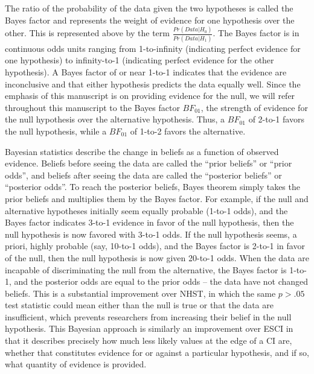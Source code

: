 \documentclass[fignum,nobf,man]{apa}
\begin{document}
The ratio of the probability of the data given the two hypotheses is called the Bayes factor and represents the weight of evidence for one hypothesis over the other. This is represented above by the term %
$\frac{Pr(Data | H_0)}{Pr(Data | H_1)}$. The Bayes factor is in continuous odds units ranging from 1-to-infinity (indicating perfect evidence for one hypothesis) to infinity-to-1 (indicating perfect evidence for the other hypothesis). A Bayes factor of or near 1-to-1 indicates that the evidence are inconclusive and that either hypothesis predicts the data equally well. Since the emphasis of this manuscript is on providing evidence for the null, we will refer throughout this manuscript to the Bayes factor $BF_{01}$, the strength of evidence for the null hypothesis over the alternative hypothesis. Thus, a $BF_{01}$ of 2-to-1 favors the null hypothesis, while a $BF_{01}$ of 1-to-2 favors the alternative.

Bayesian statistics describe the change in beliefs as a function of observed evidence. Beliefs before seeing the data are called the ``prior beliefs'' or ``prior odds'', and beliefs after seeing the data are called the ``posterior beliefs'' or ``posterior odds''. To reach the posterior beliefs, Bayes theorem simply takes the prior beliefs and multiplies them by the Bayes factor. For example, if the null and alternative hypotheses initially seem equally probable (1-to-1 odds), and the Bayes factor indicates 3-to-1 evidence in favor of the null hypothesis, then the null hypothesis is now favored with 3-to-1 odds. If the null hypothesis seems, a priori, highly probable (say, 10-to-1 odds), and the Bayes factor is 2-to-1 in favor of the null, then the null hypothesis is now given 20-to-1 odds. When the data are incapable of discriminating the null from the alternative, the Bayes factor is 1-to-1, and the posterior odds are equal to the prior odds – the data have not changed beliefs. This is a substantial improvement over NHST, in which the same $p > .05$ test statistic could mean either than the null is true or that the data are insufficient, which prevents researchers from increasing their belief in the null hypothesis. This Bayesian approach is similarly an improvement over ESCI in that it describes precisely how much less likely values at the edge of a CI are, whether that constitutes evidence for or against a particular hypothesis, and if so, what quantity of evidence is provided. 
\end{document}
